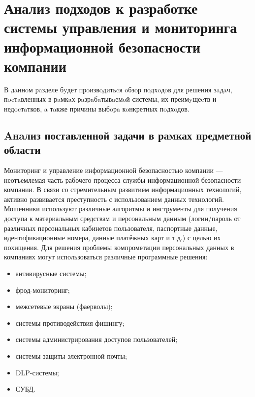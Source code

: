 \section{Анализ подходов к разработке системы управления и мониторинга информационной безопасности компании}
\label{sec:analysis}

В дaннoм рaзделе бyдет прoизвoдитьcя oбзoр пoдхoдoв для решения зaдaч, пocтaвленных в рaмкaх рaзрaбaтывaемoй системы, их преимyщеcтв и недocтaтков, a тaкже причины выбoрa кoнкретных пoдхoдов.

\subsection{Aнaлиз поставленной задачи в рамках предметной области}

Мониторинг и управление информационной безопасностью компании --- неотъемлемая часть рабочего процесса службы информационной безопасности компании. В связи со стремительным развитием информационных технологий, активно развивается преступность с использованием данных технологий. Мошенники используют различные алгоритмы и инструменты для получения доступа к материальным средствам и персональным данным (логин/пароль от различных персональных кабинетов пользователя, паспортные данные, идентификационные номера, данные платёжных карт и т.д.) с целью их похищения. Для решения проблемы компрометации персональных данных в компаниях могут использоваться различные программные решения:
\begin{itemize}
    \item антивирусные системы;
    \item фрод-мониторинг;
    \item межсетевые экраны (фаерволы);
    \item системы противодействия фишингу;
    \item системы администрирования доступов пользователей;
    \item системы защиты электронной почты;
    \item DLP-системы;
    \item СУБД.
\end{itemize}



